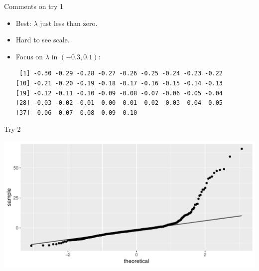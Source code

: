 \begin{frame}[fragile]{Comments on try 1}

  \begin{itemize}
\item Best: $\lambda$ just less than zero.
\item Hard to see scale. 
\item Focus on $\lambda$ in $(-0.3,0.1)$:
{\small    
 
\begin{knitrout}
\color{fgcolor}\begin{kframe}
\begin{alltt}
\hlkwb{=}\hlstd{(}\hlopt{-}\hlstd{,}\hlstd{,}\hlstd{)}
\end{alltt}
\begin{verbatim}
 [1] -0.30 -0.29 -0.28 -0.27 -0.26 -0.25 -0.24 -0.23 -0.22
[10] -0.21 -0.20 -0.19 -0.18 -0.17 -0.16 -0.15 -0.14 -0.13
[19] -0.12 -0.11 -0.10 -0.09 -0.08 -0.07 -0.06 -0.05 -0.04
[28] -0.03 -0.02 -0.01  0.00  0.01  0.02  0.03  0.04  0.05
[37]  0.06  0.07  0.08  0.09  0.10
\end{verbatim}
\end{kframe}
\end{knitrout}
}


\end{itemize}

  
  
\end{frame}




\begin{frame}[fragile]{Try 2}

 
\begin{knitrout}
\color{fgcolor}\begin{kframe}
\begin{alltt}
\hlopt{~}\hlopt{+}\hlopt{+}
\end{alltt}
\end{kframe}
\includegraphics[width=\maxwidth]{figure/unnamed-chunk-29-1} 

\end{knitrout}

  

\end{frame}

